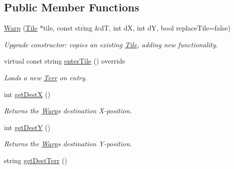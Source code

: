 \subsection*{Public Member Functions}
\begin{DoxyCompactItemize}
\item 
\hyperlink{class_warp_aec35a5ec4bde7308a9a3c27260552e12}{Warp} (\hyperlink{class_tile}{Tile} $\ast$tile, const string \&dT, int dX, int dY, bool replace\+Tile=false)\hypertarget{class_warp_aec35a5ec4bde7308a9a3c27260552e12}{}\label{class_warp_aec35a5ec4bde7308a9a3c27260552e12}

\begin{DoxyCompactList}\small\item\em Upgrade constructor\+: copies an existing \hyperlink{class_tile}{Tile}, adding new functionality. \end{DoxyCompactList}\item 
virtual const string \hyperlink{class_warp_a28e607e491d761c1baad786e911a2681}{enter\+Tile} () override\hypertarget{class_warp_a28e607e491d761c1baad786e911a2681}{}\label{class_warp_a28e607e491d761c1baad786e911a2681}

\begin{DoxyCompactList}\small\item\em Loads a new \hyperlink{class_terr}{Terr} on entry. \end{DoxyCompactList}\item 
int \hyperlink{class_warp_aaf9aa0b517287c71acb3ee383851084f}{get\+DestX} ()\hypertarget{class_warp_aaf9aa0b517287c71acb3ee383851084f}{}\label{class_warp_aaf9aa0b517287c71acb3ee383851084f}

\begin{DoxyCompactList}\small\item\em Returns the \hyperlink{class_warp}{Warp}\textquotesingle{}s destination X-\/position. \end{DoxyCompactList}\item 
int \hyperlink{class_warp_af31ad0229b4e694f945546746dc46e99}{get\+DestY} ()\hypertarget{class_warp_af31ad0229b4e694f945546746dc46e99}{}\label{class_warp_af31ad0229b4e694f945546746dc46e99}

\begin{DoxyCompactList}\small\item\em Returns the \hyperlink{class_warp}{Warp}\textquotesingle{}s destination Y-\/position. \end{DoxyCompactList}\item 
string \hyperlink{class_warp_a5c61204c5eafbd5dfa8a365c08257eec}{get\+Dest\+Terr} ()
\end{DoxyCompactItemize}
